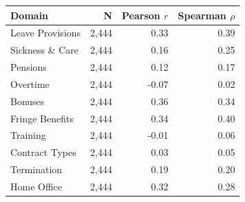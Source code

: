 \begin{tabular}{lrrr}
    \hline\hline
    Domain & N & Pearson $r$ & Spearman $\rho$ \\
    \hline
    Leave Provisions & 2,444 & 0.33 & 0.39 \\
    Sickness \& Care & 2,444 & 0.16 & 0.25 \\
    Pensions & 2,444 & 0.12 & 0.17 \\
    Overtime & 2,444 & -0.07 & 0.02 \\
    Bonuses & 2,444 & 0.36 & 0.34 \\
    Fringe Benefits & 2,444 & 0.34 & 0.40 \\
    Training & 2,444 & -0.01 & 0.06 \\
    Contract Types & 2,444 & 0.03 & 0.05 \\
    Termination & 2,444 & 0.19 & 0.20 \\
    Home Office & 2,444 & 0.32 & 0.28 \\
    \hline\hline
\end{tabular}

